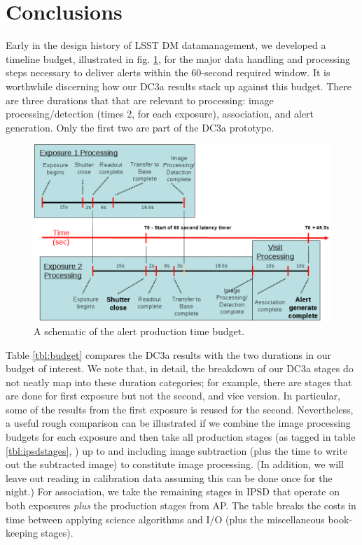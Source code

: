 
\section{Conclusions}

Early in the design history of LSST DM datamanagement, we developed a
timeline budget, illustrated in fig. \ref{fig:timeline}, for the major
data handling and processing steps necessary to deliver alerts within
the 60-second required window.  It is worthwhile discerning how our
DC3a results stack up against this budget.  There are three durations
that that are relevant to processing:  image processing/detection
(times 2, for each exposure), association, and alert generation.
Only the first two are part of the DC3a prototype.  

\begin{figure}[t]
\begin{center}
\includegraphics[width=\textwidth]{images/timeline.png}
\caption{A schematic of the alert production time budget.
\label{fig:timeline}}
\end{center}
\end{figure}

Table \ref{tbl:budget} compares the DC3a results with the two
durations in our budget of interest.  We note that, in detail, the
breakdown of our DC3a stages do not neatly map into these duration
categories; for example, there are stages that are done for first
exposure but not the second, and vice version.  In particular, some of
the results from the first exposure is reused for the second.
Nevertheless, a useful rough comparison can be illustrated if we
combine the image processing budgets for each exposure and then take
all production stages (as tagged in table \ref{tbl:ipsdstages},
) up to and including image subtraction (plus the
time to write out the subtracted image) to constitute image
processing.  (In addition, we will leave out reading in calibration
data assuming this can be done once for the night.)  For association,
we take the remaining stages in IPSD that operate on both exposures
{\it plus} the production stages from AP.  The table breaks the costs
in time between applying science algorithms and I/O (plus the
miscellaneous book-keeping stages).

